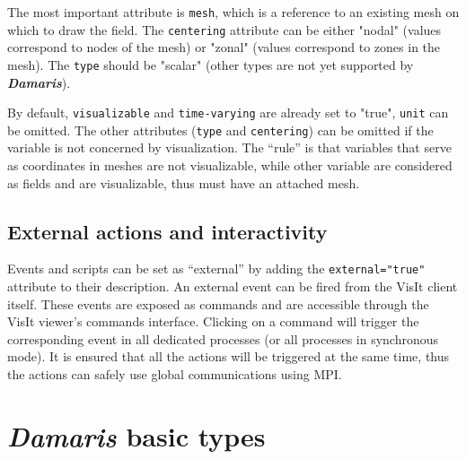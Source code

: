 \documentclass[11pt]{report}
\newcommand{\Damaris}{\emph{\textbf{Damaris}}}
\begin{document}
\noindent\begin{minipage}{\textwidth}
\vspace{0.5cm}

\end{minipage}

The most important attribute is \texttt{mesh}, which is a reference to an existing mesh on which
to draw the field. The \texttt{centering} attribute can be either "nodal" (values correspond to nodes 
of the mesh) or "zonal" (values correspond to zones in the mesh). The \texttt{type} should be
"scalar" (other types are not yet supported by \Damaris{}).

By default, \texttt{visualizable} and \texttt{time-varying} are already set to "true", \texttt{unit} can be omitted.
The other attributes (\texttt{type} and \texttt{centering}) can be omitted if the variable is not concerned by
visualization.
The ``rule'' is that variables that serve as coordinates in meshes are not visualizable, while
other variable are considered as fields and are visualizable, thus must have an attached mesh.
\section{External actions and interactivity}

Events and scripts can be set as ``external'' by adding the \texttt{external="true"} attribute to their
description. An external event can be fired from the VisIt client itself. These events are exposed as commands
and are accessible through the VisIt viewer's commands interface.
Clicking on a command will trigger the corresponding event in all dedicated processes (or all processes
in synchronous mode). It is ensured that all the actions will be triggered at the same time, thus
the actions can safely use global communications using MPI.


\appendix
\chapter{\Damaris{} basic types}\label{sec:types}
\end{document}
